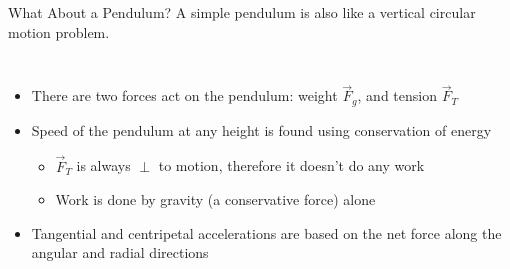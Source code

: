 \documentclass[12pt,compress,aspectratio=169]{beamer}
\begin{document}
\begin{frame}{What About a Pendulum?}
  A simple pendulum is also like a vertical circular motion problem.

  \vspace{.1in}
  \begin{columns}

    \begin{itemize}
    \item There are two forces act on the pendulum: weight $\vec F_g$, and
    tension $\vec F_T$
    \item Speed of the pendulum at any height is found using conservation
      of energy
      \begin{itemize}
      \item $\vec F_T$ is always $\perp$ to motion, therefore it doesn't
        do any work
      \item Work is done by gravity (a conservative force) alone
      \end{itemize}
    \item Tangential and centripetal accelerations are based on the net force
      along the angular and radial directions
    \end{itemize}
  \end{columns}
\end{frame}
\end{document}
